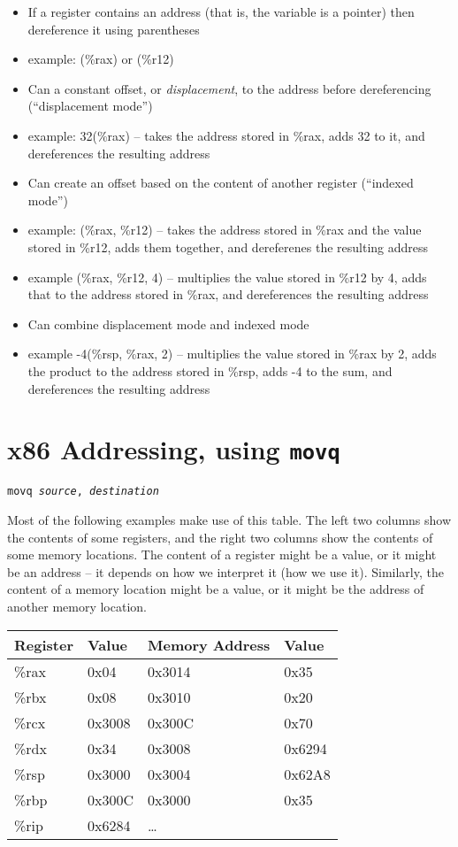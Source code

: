 \documentclass{article}
\begin{document}
\begin{itemize}
\item If a register contains an address (that is, the variable is a pointer) then dereference it using parentheses
\item example: (\%rax) or (\%r12)
\item Can  a constant offset, or \textit{displacement}, to the address before dereferencing (``displacement mode'')
\item example: 32(\%rax) -- takes the address stored in \%rax, adds 32 to it, and dereferences the resulting address
\item Can create an offset based on the content of another register (``indexed mode'')
\item example: (\%rax, \%r12) -- takes the address stored in \%rax and the value stored in \%r12, adds them together, and dereferenes the resulting address
\item example (\%rax, \%r12, 4) -- multiplies the value stored in \%r12 by 4, adds that to the address stored in \%rax, and dereferences the resulting address
\item Can combine displacement mode and indexed mode
\item example -4(\%rsp, \%rax, 2) -- multiplies the value stored in \%rax by 2, adds the product to the address stored in \%rsp, adds -4 to the sum, and dereferences the resulting address
\end{itemize}


\section{x86 Addressing, using \texttt{movq}}

\texttt{movq \textit{source}, \textit{destination}}

Most of the following examples make use of this table.
The left two columns show the contents of some registers,
and the right two columns show the contents of some memory locations.
The content of a register might be a value, or it might be an address --
it depends on how we interpret it (how we use it).
Similarly, the content of a memory location might be a value, or it might be the address of another memory location.

\begin{tabular}{|l|l||l|l|} \hline
Register & Value & Memory Address & Value \\ \hline
\%rax & 0x04   & 0x3014 & 0x35   \\ \hline
\%rbx & 0x08   & 0x3010 & 0x20   \\ \hline
\%rcx & 0x3008 & 0x300C & 0x70   \\ \hline
\%rdx & 0x34   & 0x3008 & 0x6294 \\ \hline
\%rsp & 0x3000 & 0x3004 & 0x62A8 \\ \hline
\%rbp & 0x300C & 0x3000 & 0x35   \\ \hline
\%rip & 0x6284 & \dots  &        \\ \hline
\end{tabular}
\end{document}
